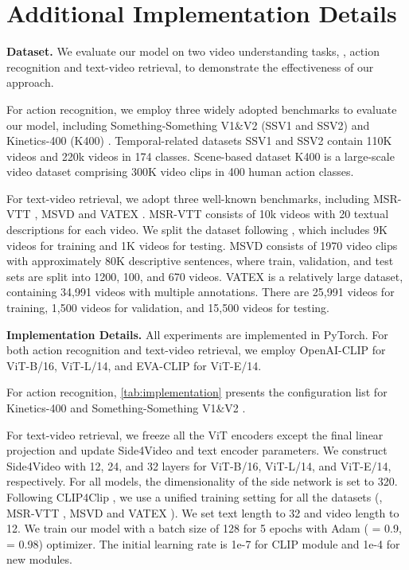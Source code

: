 \documentclass[10pt,twocolumn,letterpaper]{article}
\begin{document}
\section{Additional Implementation Details}


\noindent\textbf{Dataset.}  We evaluate our model on two video understanding tasks, \ie, action recognition and text-video retrieval, to demonstrate the effectiveness of our approach.

For action recognition, we employ three widely adopted benchmarks to evaluate our model, including Something-Something V1\&V2 (SSV1 and SSV2) \cite{something} and Kinetics-400 (K400) \cite{kinetics}. Temporal-related datasets SSV1 and SSV2 contain 110K videos and 220k videos in 174 classes. Scene-based dataset K400 is a large-scale video dataset comprising 300K video clips in 400 human action classes.

For text-video retrieval, we adopt three well-known benchmarks, including MSR-VTT \cite{msrvtt}, MSVD \cite{msvd} and VATEX \cite{vatex}. MSR-VTT consists of 10k videos with 20 textual descriptions for each video. We split the dataset following \cite{multi-modal4tvr, clip4clip, howto100m}, which includes 9K videos for training and 1K videos for testing. MSVD consists of 1970 video clips with approximately 80K descriptive sentences, where train, validation, and test sets are split into 1200, 100, and 670 videos. VATEX is a relatively large dataset, containing 34,991 videos with multiple annotations. There are 25,991 videos for training, 1,500 videos for validation, and 15,500 videos for testing.



\noindent\textbf{Implementation Details.} All experiments are implemented in PyTorch. For both action recognition and text-video retrieval, we employ OpenAI-CLIP \cite{clip} for ViT-B/16, ViT-L/14, and EVA-CLIP \cite{eva} for ViT-E/14.

For action recognition, \cref{tab:implementation} presents the configuration list for Kinetics-400 \cite{kinetics} and Something-Something V1\&V2 \cite{something}.

For text-video retrieval, we freeze all the ViT encoders except the final linear projection and update Side4Video and text encoder parameters. We construct Side4Video with 12, 24, and 32 layers for ViT-B/16, ViT-L/14, and ViT-E/14, respectively. For all models, the dimensionality of the side network is set to 320. Following CLIP4Clip \cite{clip4clip}, we use a unified training setting for all the datasets (\ie, MSR-VTT \cite{msrvtt}, MSVD \cite{msvd} and VATEX \cite{vatex}). We set text length to 32 and video length to 12. We train our model with a batch size of 128 for 5 epochs with Adam ( = 0.9,  = 0.98) optimizer. The initial learning rate is 1e-7 for CLIP module and 1e-4 for new modules.  
\end{document}
